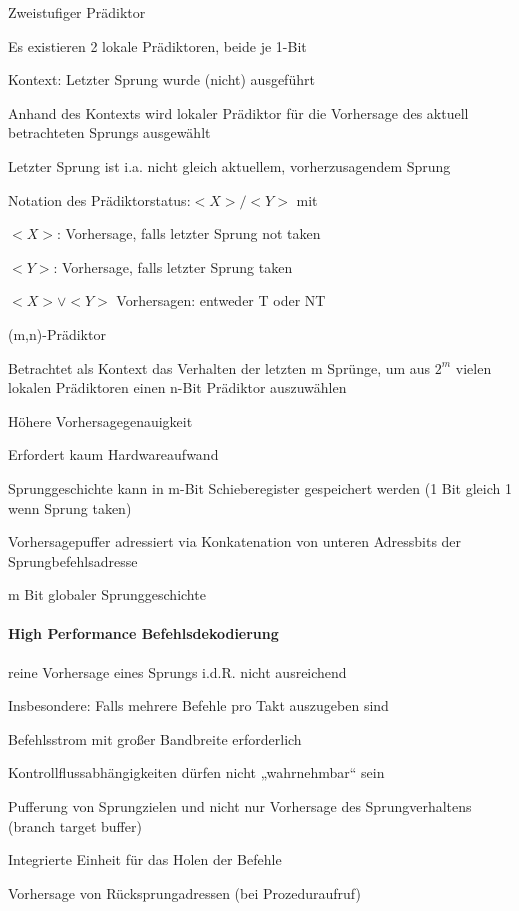 \documentclass[10pt,landscape]{article}
\begin{document}
\begin{multicols}{3}
  Zweistufiger Prädiktor
  \begin{itemize*}
    \item Es existieren 2 lokale Prädiktoren, beide je 1-Bit
    \item Kontext: Letzter Sprung wurde (nicht) ausgeführt
    \item Anhand des Kontexts wird lokaler Prädiktor für die Vorhersage des aktuell betrachteten Sprungs ausgewählt
    \item Letzter Sprung ist i.a. nicht gleich aktuellem, vorherzusagendem Sprung
    \item Notation des Prädiktorstatus:$<X>/<Y>$ mit
    \item $<X>$: Vorhersage, falls letzter Sprung not taken
    \item $<Y>$: Vorhersage, falls letzter Sprung taken
    \item $<X>\vee<Y>$ Vorhersagen: entweder T oder NT
  \end{itemize*}
  
  (m,n)-Prädiktor
  \begin{itemize*}
    \item Betrachtet als Kontext das Verhalten der letzten m Sprünge, um aus $2^m$ vielen lokalen Prädiktoren einen n-Bit Prädiktor auszuwählen
    \item Höhere Vorhersagegenauigkeit
    \item Erfordert kaum Hardwareaufwand
    \item Sprunggeschichte kann in m-Bit Schieberegister gespeichert werden (1 Bit gleich 1 wenn Sprung taken)
    \item Vorhersagepuffer adressiert via Konkatenation von unteren Adressbits der Sprungbefehlsadresse
    \item m Bit globaler Sprunggeschichte
  \end{itemize*}
  
  \paragraph{ High Performance Befehlsdekodierung}
  reine Vorhersage eines Sprungs i.d.R. nicht ausreichend
  \begin{itemize*}
    \item Insbesondere: Falls mehrere Befehle pro Takt auszugeben sind
    \item Befehlsstrom mit großer Bandbreite erforderlich
    \item Kontrollflussabhängigkeiten dürfen nicht „wahrnehmbar“ sein 
    \item Pufferung von Sprungzielen und nicht nur Vorhersage des Sprungverhaltens (branch target buffer)
    \item Integrierte Einheit für das Holen der Befehle
    \item Vorhersage von Rücksprungadressen (bei Prozeduraufruf)
  \end{itemize*}
  

\end{multicols}
\end{document}
